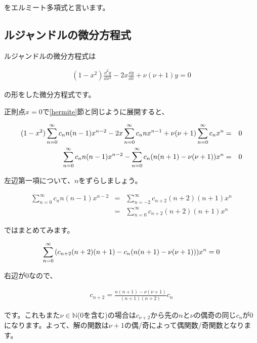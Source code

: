 \noindent
をエルミート多項式と言います。

\fi









\subsection{ルジャンドルの微分方程式}
\label{legendre}
ルジャンドルの微分方程式は

\begin{eqnarray}
(1-x^2)\frac{\dd^2 y}{\dd x^2}-2x\frac{\dd y}{\dd x}+\nu(\nu+1)y=0
\end{eqnarray}

\noindent
の形をした微分方程式です。

正則点$x=0$で\ref{hermite}節と同じように展開すると、

\begin{eqnarray}
    (1-x^2)\sum_{n=0}^\infty c_n n(n-1)x^{n-2}-2x\sum_{n=0}^\infty c_n nx^{n-1}+\nu(\nu+1)\sum_{n=0}^\infty c_nx^n&=&0 \\
    \sum_{n=0}^\infty c_n n(n-1)x^{n-2}-\sum_{n=0}^\infty c_n\pqty{n(n+1)-\nu(\nu+1)}x^n&=&0
\end{eqnarray}

左辺第一項について、$n$をずらしましょう。

\begin{eqnarray}
    \sum_{n=0}^\infty c_n n(n-1)x^{n-2}&=&\sum_{n=-2}^\infty c_{n+2} (n+2)(n+1)x^n \\
    &=&\sum_{n=0}^\infty c_{n+2} (n+2)(n+1)x^n
\end{eqnarray}

ではまとめてみます。

\begin{eqnarray}
    \sum_{n=0}^\infty \pqty{c_{n+2}(n+2)(n+1)-c_n(n(n+1)-\nu(\nu+1))}x^n=0
\end{eqnarray}

右辺が0なので、

\begin{eqnarray}
    c_{n+2}=\frac{n(n+1)-\nu(\nu+1)}{(n+1)(n+2)}c_n
\end{eqnarray}

\noindent
です。これもまた$\nu\in\mathbb{N}$(0を含む)の場合は$c_{\nu+2}$から先の$n$と$\nu$の偶奇の同じ$c_n$が0になります。よって、解の関数は$\nu+1$の偶/奇によって偶関数/奇関数となります。








